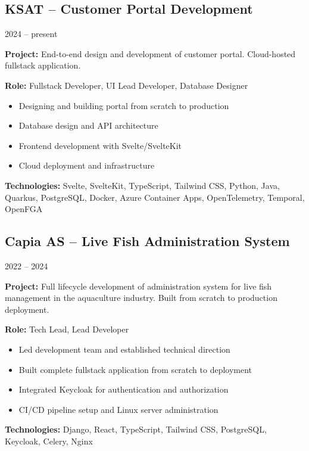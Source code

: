 \documentclass[10pt, a4paper]{article}
\begin{document}
\vspace{0.8em}
\subsection*{KSAT -- Customer Portal Development}
{\small\color{lightgray}2024 -- present}

{\small
\textbf{Project:} End-to-end design and development of customer portal. Cloud-hosted fullstack application.

\textbf{Role:} Fullstack Developer, UI Lead Developer, Database Designer

\begin{itemize}[noitemsep, leftmargin=1.2em, topsep=0.2em]
    \item Designing and building portal from scratch to production
    \item Database design and API architecture
    \item Frontend development with Svelte/SvelteKit
    \item Cloud deployment and infrastructure
\end{itemize}

\textbf{Technologies:} Svelte, SvelteKit, TypeScript, Tailwind CSS, Python, Java, Quarkus, PostgreSQL, Docker, Azure Container Apps, OpenTelemetry, Temporal, OpenFGA
}

\vspace{0.8em}
\subsection*{Capia AS -- Live Fish Administration System}
{\small\color{lightgray}2022 -- 2024}

{\small
\textbf{Project:} Full lifecycle development of administration system for live fish management in the aquaculture industry. Built from scratch to production deployment.

\textbf{Role:} Tech Lead, Lead Developer

\begin{itemize}[noitemsep, leftmargin=1.2em, topsep=0.2em]
    \item Led development team and established technical direction
    \item Built complete fullstack application from scratch to deployment
    \item Integrated Keycloak for authentication and authorization
    \item CI/CD pipeline setup and Linux server administration
\end{itemize}

\textbf{Technologies:} Django, React, TypeScript, Tailwind CSS, PostgreSQL, Keycloak, Celery, Nginx
}
\end{document}
